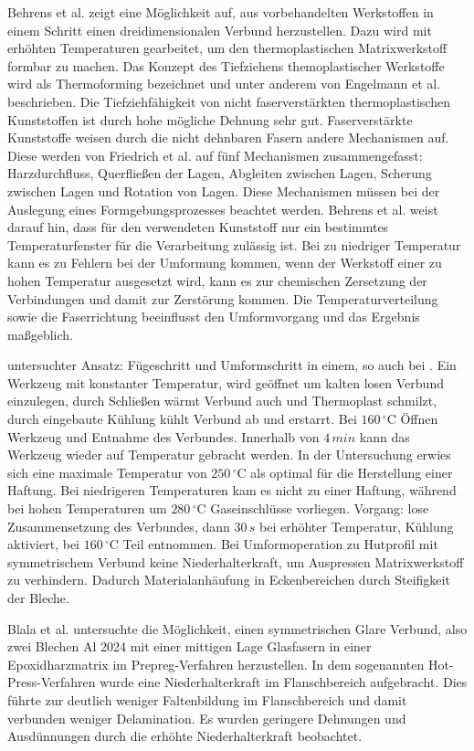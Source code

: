 Behrens et al. \cite{Behrens.2014} zeigt eine Möglichkeit auf, aus vorbehandelten Werkstoffen in einem Schritt einen dreidimensionalen Verbund herzustellen.
Dazu wird mit erhöhten Temperaturen gearbeitet, um den thermoplastischen Matrixwerkstoff formbar zu machen.
Das Konzept des Tiefziehens themoplastischer Werkstoffe wird als Thermoforming bezeichnet und unter anderem von Engelmann et al. \cite{Engelmann.2012} beschrieben.
Die Tiefziehfähigkeit von nicht faserverstärkten thermoplastischen Kunststoffen ist durch hohe mögliche Dehnung sehr gut.
Faserverstärkte Kunststoffe weisen durch die nicht dehnbaren Fasern andere Mechanismen auf.
Diese werden von Friedrich et al. \cite{Friedrich.1997} auf fünf Mechanismen zusammengefasst: Harzdurchfluss, Querfließen der Lagen, Abgleiten zwischen Lagen, Scherung zwischen Lagen und Rotation von Lagen.
Diese Mechanismen müssen bei der Auslegung eines Formgebungsprozesses beachtet werden.
Behrens et al. \cite{Behrens.2014} weist darauf hin, dass für den verwendeten Kunststoff nur ein bestimmtes Temperaturfenster für die Verarbeitung zulässig ist.
Bei zu niedriger Temperatur kann es zu Fehlern bei der Umformung kommen, wenn der Werkstoff einer zu hohen Temperatur ausgesetzt wird, kann es zur chemischen Zersetzung der Verbindungen und damit zur Zerstörung kommen.
Die Temperaturverteilung sowie die Faserrichtung beeinflusst den Umformvorgang und das Ergebnis maßgeblich.

untersuchter Ansatz: Fügeschritt und Umformschritt in einem, so auch bei \cite{BerndArno.2017}.
Ein Werkzeug mit konstanter Temperatur, wird geöffnet um kalten losen Verbund einzulegen, durch Schließen wärmt Verbund auch und Thermoplast schmilzt, durch eingebaute Kühlung kühlt Verbund ab und erstarrt. Bei $160 \, ^\circ \text{C}$ Öffnen Werkzeug und Entnahme des Verbundes.
Innerhalb von $4\, min$ kann das Werkzeug wieder auf Temperatur gebracht werden.
In der Untersuchung erwies sich eine maximale Temperatur von $250 \, ^\circ \text{C}$ als optimal für die Herstellung einer Haftung.
Bei niedrigeren Temperaturen kam es nicht zu einer Haftung, während bei hohen Temperaturen um $280 \, ^\circ \text{C}$ Gaseinschlüsse vorliegen.
Vorgang: lose Zusammensetzung des Verbundes, dann $30 \, s$ bei erhöhter Temperatur, Kühlung aktiviert, bei $160 \, ^\circ \text{C}$ Teil entnommen.
Bei Umformoperation zu Hutprofil mit symmetrischem Verbund keine Niederhalterkraft, um Auspressen Matrixwerkstoff zu verhindern.
Dadurch Materialanhäufung in Eckenbereichen durch Steifigkeit der Bleche.

Blala et al. \cite{Blala.2021} untersuchte die Möglichkeit, einen symmetrischen Glare Verbund, also zwei Blechen Al 2024 mit einer mittigen Lage Glasfasern in einer Epoxidharzmatrix im Prepreg-Verfahren herzustellen. In dem sogenannten Hot-Press-Verfahren wurde eine Niederhalterkraft im Flanschbereich aufgebracht. Dies führte zur deutlich weniger Faltenbildung im Flanschbereich und damit verbunden weniger Delamination. Es wurden geringere Dehnungen und Ausdünnungen durch die erhöhte Niederhalterkraft beobachtet.

